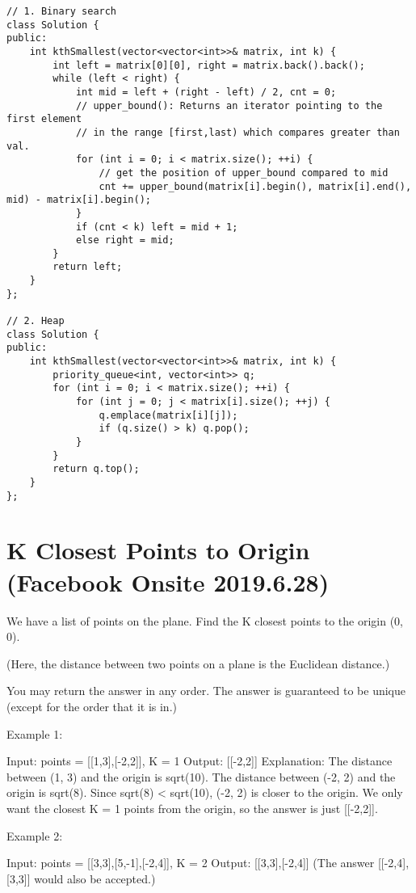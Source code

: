 \begin{lstlisting}
// 1. Binary search
class Solution {
public:
    int kthSmallest(vector<vector<int>>& matrix, int k) {
        int left = matrix[0][0], right = matrix.back().back();
        while (left < right) {
            int mid = left + (right - left) / 2, cnt = 0;
            // upper_bound(): Returns an iterator pointing to the first element 
            // in the range [first,last) which compares greater than val.
            for (int i = 0; i < matrix.size(); ++i) {
                // get the position of upper_bound compared to mid
                cnt += upper_bound(matrix[i].begin(), matrix[i].end(), mid) - matrix[i].begin();
            }
            if (cnt < k) left = mid + 1;
            else right = mid;
        }
        return left;
    }
};

// 2. Heap
class Solution {
public:
    int kthSmallest(vector<vector<int>>& matrix, int k) {
        priority_queue<int, vector<int>> q;
        for (int i = 0; i < matrix.size(); ++i) {
            for (int j = 0; j < matrix[i].size(); ++j) {
                q.emplace(matrix[i][j]);
                if (q.size() > k) q.pop();
            }
        }
        return q.top();
    }
};
\end{lstlisting}

\section{K Closest Points to Origin (Facebook Onsite 2019.6.28)}
We have a list of points on the plane.  Find the K closest points to the origin (0, 0).

(Here, the distance between two points on a plane is the Euclidean distance.)

You may return the answer in any order.  The answer is guaranteed to be unique (except for the order that it is in.)

 

Example 1:

Input: points = [[1,3],[-2,2]], K = 1
Output: [[-2,2]]
Explanation: 
The distance between (1, 3) and the origin is sqrt(10).
The distance between (-2, 2) and the origin is sqrt(8).
Since sqrt(8) < sqrt(10), (-2, 2) is closer to the origin.
We only want the closest K = 1 points from the origin, so the answer is just [[-2,2]].

Example 2:

Input: points = [[3,3],[5,-1],[-2,4]], K = 2
Output: [[3,3],[-2,4]]
(The answer [[-2,4],[3,3]] would also be accepted.)

